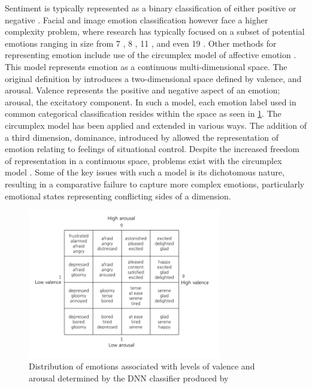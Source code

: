 \documentclass{article}
\begin{document}
Sentiment is typically represented as a binary classification of either positive or negative \citep{yang2018visual, chen2014deepsentibank}.
Facial and image emotion classification however face a higher complexity problem, where research has typically focused on a subset of potential emotions ranging in size from 7 \citep{ali2017emotional}, 8 \citep{machajdik2010affective}, 11 \citep{wangarttalk}, and even 19 \citep{mohammad2018wikiart}.
Other methods for representing emotion include use of the circumplex model of affective emotion \citep{russell1980circumplex, bradley1994measuring}.
This model represents emotion as a continuous multi-dimensional space.
The original definition by \citet{russell1980circumplex} introduces a two-dimensional space defined by valence, and arousal.
Valence represents the positive and negative aspect of an emotion; arousal, the excitatory component.
In such a model, each emotion label used in common categorical classification resides within the space as seen in \ref{fig:valence-arousal}.
The circumplex model has been applied and extended in various ways.
The addition of a third dimension, dominance, introduced by \citet{bradley1994measuring} allowed the representation of emotion relating to feelings of situational control.
Despite the increased freedom of representation in a continuous space, problems exist with the circumplex model \citep{larsen1992promises}.
Some of the key issues with such a model is its dichotomous nature, resulting in a comparative failure to capture more complex emotions, particularly emotional states representing conflicting sides of a dimension.

\begin{figure}[h!]
	\centering
	\includegraphics[width=0.75\textwidth]{images/valence-arousal-grid.png}
	\caption{Distribution of emotions associated with levels of valence and arousal determined by the DNN classifier produced by \citet{kim2018building}}
	\label{fig:valence-arousal}
\end{figure}
\end{document}

